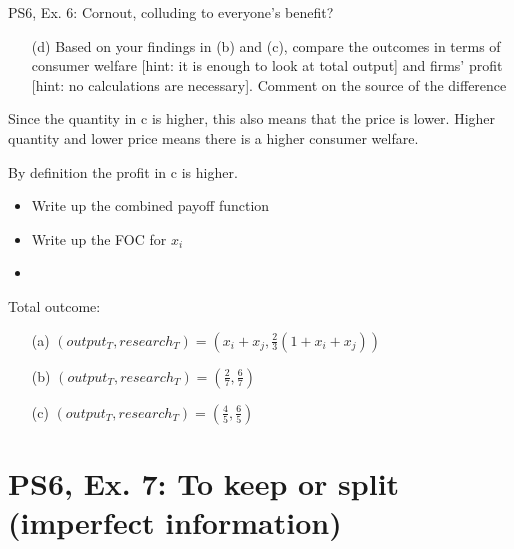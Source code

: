 \begin{frame}{PS6, Ex. 6: Cornout, colluding to everyone's benefit?}
    \begin{itemize}
    \item[(d)] Based on your findings in (b) and (c), compare the outcomes in terms of consumer
welfare [hint: it is enough to look at total output] and firms’ profit [hint: no calculations are necessary]. Comment on the source of the difference
    \end{itemize}
    \vfill\null
Since the quantity in c is higher, this also means that the price is lower. Higher quantity and lower price means there is a higher consumer welfare.

By definition the profit in c is higher.

\vspace{-10pt}
  \begin{multicols}{2}
    \begin{itemize}
      \item Write up the combined payoff function
      \item Write up the FOC for $x_i$
      \item {}
    \end{itemize}
    \vfill\null \columnbreak
    Total outcome:
    \begin{itemize}
    \item[(a)] $(output_T,research_T)= \left(x_i+x_j, \frac{2}{3}(1+x_i+x_j)\right)$
    \item[(b)] $(output_T,research_T)= \left(\frac{2}{7},\frac{6}{7}\right)$
    \item[(c)] $(output_T,research_T)= \left(\frac{4}{5},\frac{6}{5}\right)$
    \end{itemize}
    \vfill\null
  \end{multicols}
\end{frame}


\section{PS6, Ex. 7: To keep or split (imperfect information)}

